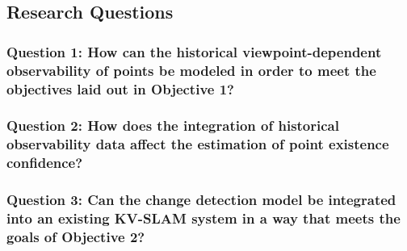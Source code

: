 \subsection{Research Questions}

\subsubsection*{Question 1: How can the historical viewpoint-dependent observability of points be modeled in order to meet the objectives laid out in Objective 1?}



\subsubsection*{Question 2: How does the integration of historical observability data affect the estimation of point existence confidence?}



\subsubsection*{Question 3: Can the change detection model be integrated into an existing KV-SLAM system in a way that meets the goals of Objective 2?}